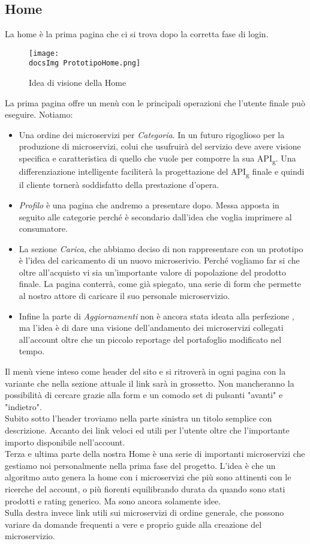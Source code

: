 {	\subsection{Home}{
		La home è la prima pagina che ci si trova dopo la corretta fase di login. \\
		\begin{figure}[ht]
			\centering
			\texttt{[image: \\docsImg PrototipoHome.png]}
			\caption{Idea di visione della Home}
			\label{PrototipoHome}
		\end{figure}
		La prima pagina offre un menù con le principali operazioni che l'utente finale può eseguire. Notiamo:
		\begin{itemize}
			\item Una ordine dei microservizi per \textit{Categoria}. In un futuro rigoglioso per la produzione di microservizi, colui che usufruirà del servizio deve avere visione specifica e caratteristica di quello che vuole per comporre la sua API\textsubscript{g}. Una differenziazione intelligente faciliterà la progettazione del API\textsubscript{g} finale e quindi il cliente tornerà soddisfatto della prestazione d'opera.
			\item \textit{Profilo} è una pagina che andremo a presentare dopo. Messa apposta in seguito alle categorie perché è secondario dall'idea che voglia imprimere al consumatore.
			\item La sezione \textit{Carica}, che abbiamo deciso di non rappresentare con un prototipo è l'idea del caricamento di un nuovo microserivio. Perché vogliamo far si che oltre all'acquisto vi sia un'importante valore di popolazione del prodotto finale. La pagina conterrà, come già spiegato, una serie di form che permette al nostro attore di caricare il suo personale microservizio.
			\item Infine la parte di \textit{Aggiornamenti} non è ancora stata ideata alla perfezione , ma l'idea è di dare una visione dell'andamento dei microservizi collegati all'account oltre che un piccolo reportage del portafoglio modificato nel tempo.
		\end{itemize}
		Il menù viene inteso come header del sito e si ritroverà in ogni pagina con la variante che nella sezione attuale il link sarà in grossetto. Non mancheranno la possibilità di cercare grazie alla form e un comodo set di pulsanti "avanti" e "indietro".\\
		Subito sotto l'header troviamo nella parte sinistra un titolo semplice con descrizione. Accanto dei link veloci ed utili per l'utente oltre che l'importante importo disponibile nell'account.\\
		Terza e ultima parte della nostra Home è una serie di importanti microservizi che gestiamo noi personalmente nella prima fase del progetto. L'idea è che un algoritmo auto genera la home con i microservizi che più sono attinenti con le ricerche del account, o più fiorenti equilibrando durata da quando sono stati prodotti e rating generico. Ma sono ancora solamente idee.\\
		Sulla destra invece link utili sui microservizi di ordine generale, che possono variare da domande frequenti a vere e proprio guide alla creazione del microservizio.
	}
	
}

